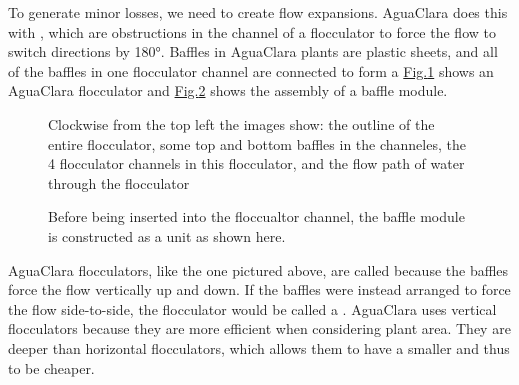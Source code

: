 \documentclass[letterpaper,10pt,english]{sphinxmanual}
\begin{document}
To generate minor losses, we need to create flow expansions. AguaClara does this with , which are obstructions in the channel of a flocculator to force the flow to switch directions by 180°. Baffles in AguaClara plants are plastic sheets, and all of the baffles in one flocculator channel are connected to form a  \hyperref[\detokenize{Flocculation/Floc_Design:figure-ac-flocculator}]{Fig.\@ \ref{\detokenize{Flocculation/Floc_Design:figure-ac-flocculator}}} shows an AguaClara flocculator and \hyperref[\detokenize{Flocculation/Floc_Design:figure-baffle-module}]{Fig.\@ \ref{\detokenize{Flocculation/Floc_Design:figure-baffle-module}}} shows the assembly of a baffle module.

\begin{figure}[htbp]
\centering
\capstart

\noindent{}
\caption{Clockwise from the top left the images show: the outline of the entire flocculator, some top and bottom baffles in the channeles, the 4 flocculator channels in this flocculator, and the flow path of water through the flocculator}\label{\detokenize{Flocculation/Floc_Design:id3}}\label{\detokenize{Flocculation/Floc_Design:figure-ac-flocculator}}\end{figure}

\begin{figure}[htbp]
\centering
\capstart

\noindent{}
\caption{Before being inserted into the floccualtor channel, the baffle module is constructed as a unit as shown here.}\label{\detokenize{Flocculation/Floc_Design:id4}}\label{\detokenize{Flocculation/Floc_Design:figure-baffle-module}}\end{figure}

AguaClara flocculators, like the one pictured above, are called  because the baffles force the flow vertically up and down. If the baffles were instead arranged to force the flow side-to-side, the flocculator would be called a . AguaClara uses vertical flocculators because they are more efficient when considering plant area. They are deeper than horizontal flocculators, which allows them to have a smaller  and thus to be cheaper.
\end{document}
